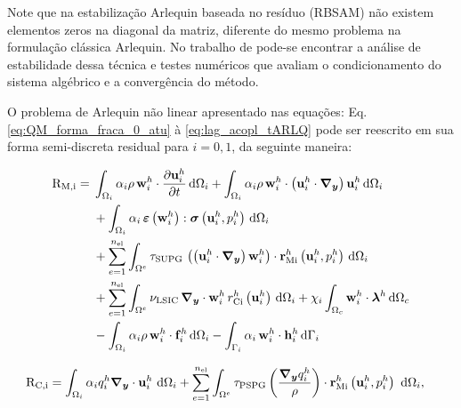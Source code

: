 \documentclass[tese_patricia]{subfiles}
\begin{document}
Note que na estabilização Arlequin baseada no resíduo (RBSAM) não existem elementos zeros na diagonal da matriz, diferente do mesmo problema na formulação clássica Arlequin. No trabalho de  pode-se encontrar a análise de estabilidade dessa técnica e testes numéricos que avaliam o condicionamento do sistema algébrico e a convergência do método.

O problema de Arlequin não linear apresentado nas equações: Eq. \ref{eq:QM_forma_fraca_0_atu} à \ref{eq:lag_acopl_tARLQ} pode ser reescrito em sua forma semi-discreta residual para $i=0,1$, da seguinte maneira:

\begin{align}
	\begin{split}
		\mathrm{R}_\mathrm{M,i} =\; & \int_{\Omega_i} \alpha_i \rho\, \mathbf{w}_i^h \cdot \frac{\partial\mathbf{u}_i^{h}}{\partial t} \, \mathrm{d} \Omega_i 
		+ \int_{\Omega_i} \alpha_i \rho\, \mathbf{w}_i^h \cdot \left( \mathbf{u}_i^{h} \cdot \boldsymbol{\nabla_y} \right)\mathbf{u}_i^{h} \, \mathrm{d} \Omega_i  \\ 
		&+ \int_{\Omega_i} \alpha_i\, \bm{\varepsilon} \left(\mathbf{w}_i^h\right) : \boldsymbol{\sigma} \left(\mathbf{u}_i^{h},p_i^{h}\right) \, \mathrm{d} \Omega_i 
		\\ 
		&+ \sum_{e=1}^{n_{\mathrm{el}}} \int_{\Omega^e} \tau_{\mathrm{SUPG}}\, \left( \left( \mathbf{u}_i^{h} \cdot \boldsymbol{\nabla_y} \right)\mathbf{w}_i^h \right) \cdot \mathbf{r}_{\mathrm{Mi}}^{h} \left(\mathbf{u}_i^{h},p_i^{h} \right) \, \mathrm{d} \Omega_i \\ 
		&+ \sum_{e=1}^{n_{\mathrm{el}}} \int_{\Omega^e} \nu_{\mathrm{LSIC}}\, \boldsymbol{\nabla_y} \cdot \mathbf{w}_i^h\, r_{\mathrm{Ci}}^{h} \left(\mathbf{u}_i^{h}\right) \, \mathrm{d} \Omega_i 
		+ \chi_{i} \int_{\Omega_c} \mathbf{w}_i^h \cdot \boldsymbol{\lambda}^{h} \, \mathrm{d} \Omega_c \\
		&- \int_{\Omega_i} \alpha_i \rho\, \mathbf{w}_i^h \cdot \mathbf{f}_i^h \, \mathrm{d} \Omega_i 
		- \int_{\Gamma_i} \alpha_i\, \mathbf{w}_i^h \cdot \mathbf{h}_i^h \, \mathrm{d} \Gamma_i
	\end{split}
\end{align}




\begin{align}
	\begin{split}
		&\mathrm{R}_\mathrm{C,i} = \int_{\Omega_i} \alpha_i q_i^h \boldsymbol{\nabla_y} \cdot \mathbf{u}_i^{h} \ \mathrm{d} \Omega_i +
		\sum_{e=1}^{n_{\mathrm{el}}} \int_{\Omega^e} \tau_{\mathrm{PSPG}} \left(\frac{\boldsymbol{\nabla_y} q_i^h }{\rho}\right) \cdot \mathbf{r}_{\mathrm{Mi}}^{h} \left(\mathbf{u}_i^{h},p_i^{h} \right) \  \mathrm{d} \Omega_i,
	\end{split}
\end{align}
\end{document}

